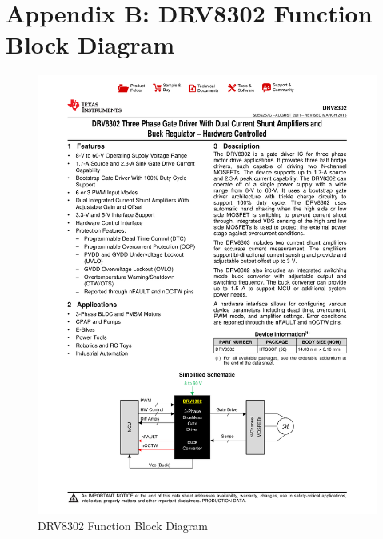 \chapter{Appendix B: DRV8302 Function Block Diagram}\label{appendix:drv8302_diag}

\begin{figure}[ht]
    \includegraphics[width=\textwidth,page=12]{Images/drv8302}
    \caption{DRV8302 Function Block Diagram}
    \label{fig:schDRV}
\end{figure}